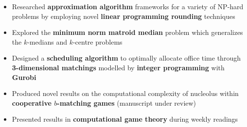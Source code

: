 \documentclass[10pt,a4paper,ragged2e]{altacv}
\begin{document}
\tagline{}{}

  \makecvheader



\begin{itemize}
    \item Researched \textbf{approximation algorithm} frameworks for a variety of NP-hard problems
      by employing novel \textbf{linear programming rounding} techniques
    \item Explored the \textbf{minimum norm matroid median} problem
      which generalizes the $k$-medians and $k$-centre problems
\end{itemize}

\divider

\begin{itemize}
    \item Designed a \textbf{scheduling algorithm} to optimally allocate office time
      through \textbf{3-dimensional matchings} modelled by \textbf{integer programming} with \textbf{Gurobi}
    \item Produced novel results on the computational complexity of nucleolus
      within \textbf{cooperative $b$-matching games}
      (manuscript under review)
    \item Presented results in \textbf{computational game theory} during weekly readings
\end{itemize}

\divider
\end{document}
